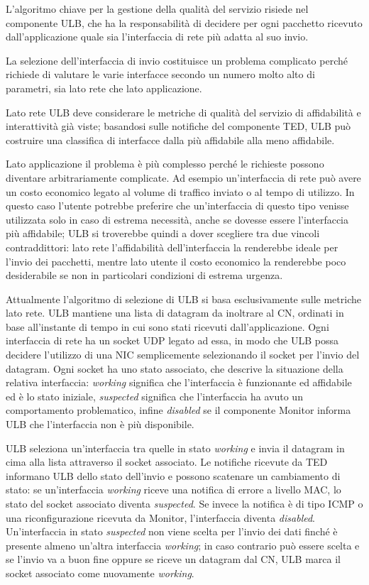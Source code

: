 \documentclass[12pt,a4paper,openright,twoside,draft]{book}
\begin{document}
L'algoritmo chiave per la gestione della qualità del servizio risiede
nel componente ULB, che ha la responsabilità di decidere per ogni
pacchetto ricevuto dall'applicazione quale sia l'interfaccia di rete
più adatta al suo invio.

La selezione dell'interfaccia di invio costituisce un problema
complicato perché richiede di valutare le varie interfacce secondo un
numero molto alto di parametri, sia lato rete che lato applicazione.

Lato rete ULB deve considerare le metriche di qualità del servizio di
affidabilità e interattività già viste; basandosi sulle notifiche del
componente TED, ULB può costruire una classifica di interfacce dalla
più affidabile alla meno affidabile.

Lato applicazione il problema è più complesso perché le richieste
possono diventare arbitrariamente complicate. Ad esempio
un'interfaccia di rete può avere un costo economico legato al volume
di traffico inviato o al tempo di utilizzo. In questo caso l'utente
potrebbe preferire che un'interfaccia di questo tipo venisse
utilizzata solo in caso di estrema necessità, anche se dovesse essere
l'interfaccia più affidabile; ULB si troverebbe quindi a dover
scegliere tra due vincoli contraddittori: lato rete l'affidabilità
dell'interfaccia la renderebbe ideale per l'invio dei pacchetti,
mentre lato utente il costo economico la renderebbe poco desiderabile
se non in particolari condizioni di estrema urgenza.

Attualmente l'algoritmo di selezione di ULB si basa esclusivamente
sulle metriche lato rete. ULB mantiene una lista di datagram da
inoltrare al CN, ordinati in base all'instante di tempo in cui sono
stati ricevuti dall'applicazione. Ogni interfaccia di rete ha un
socket UDP legato ad essa, in modo che ULB possa decidere l'utilizzo
di una NIC semplicemente selezionando il socket per l'invio del
datagram. Ogni socket ha uno stato associato, che descrive la
situazione della relativa interfaccia: \emph{working} significa che
l'interfaccia è funzionante ed affidabile ed è lo stato iniziale,
\emph{suspected} significa che l'interfaccia ha avuto un comportamento
problematico, infine \emph{disabled} se il componente Monitor informa
ULB che l'interfaccia non è più disponibile.

ULB seleziona un'interfaccia tra quelle in stato \emph{working} e
invia il datagram in cima alla lista attraverso il socket
associato. Le notifiche ricevute da TED informano ULB dello stato
dell'invio e possono scatenare un cambiamento di stato: se
un'interfaccia \emph{working} riceve una notifica di errore a livello
MAC, lo stato del socket associato diventa \emph{suspected}. Se invece
la notifica è di tipo ICMP o una riconfigurazione ricevuta da Monitor,
l'interfaccia diventa \emph{disabled}. Un'interfaccia in stato
\emph{suspected} non viene scelta per l'invio dei dati finché è
presente almeno un'altra interfaccia \emph{working}; in caso contrario
può essere scelta e se l'invio va a buon fine oppure se riceve un
datagram dal CN, ULB marca il socket associato come nuovamente
\emph{working}.
\end{document}
